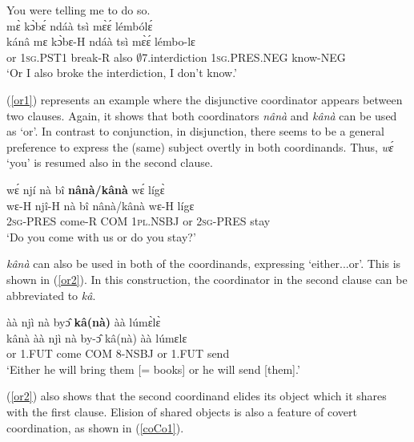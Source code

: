 \begin{exe} 
\ex\label{or} You were telling me to do so.\\
   mɛ̀ kɔ̀bɛ́ ndáà tsì mɛ̀ɛ́ lémbólɛ́\\
        kánâ mɛ kɔ̀bɛ-H ndáà tsì mɛ̀ɛ́ lémbo-lɛ\\
        or 1\textsc{sg}.PST1 break-R also $\emptyset$7.interdiction 1\textsc{sg}.PRES.NEG know-NEG \\
    \trans `Or I also broke the interdiction, I don't know.'
\end{exe}

(\ref{or1}) represents an example where the disjunctive coordinator appears between two clauses. Again, it shows that both coordinators {\itshape nânà} and {\itshape kânà} can be used as `or'. In contrast to conjunction, in disjunction, there seems to be a general preference to express the (same) subject overtly in both coordinands. Thus, {\itshape wɛ́} `you' is resumed also in the second clause.

\begin{exe}
\ex \label{or1}
  \glll     wɛ́ njí nà bî {\bfseries nânà/kânà} wɛ́ lígɛ̀ \\
             wɛ-H njî-H nà bî nânà/kânà  wɛ-H lígɛ \\
               2\textsc{sg}-PRES come-R COM 1\textsc{pl}.NSBJ or 2\textsc{sg}-PRES stay \\
    \trans `Do you come with us or do you stay?'
\end{exe}

{\itshape kânà} can also be used in both of the coordinands, expressing `either...or'. This is shown in (\ref{or2}). In this construction, the coordinator in the second clause can be abbreviated to {\itshape kâ}.

\begin{exe}
\ex \label{or2}
   àà njì nà byɔ̂ {\bfseries kâ(nà)} àà lúmɛ̀lɛ̀ \\
             kânà àà njì nà by-ɔ̂ kâ(nà) àà lúmɛlɛ \\
               or 1.FUT come COM 8-NSBJ or 1.FUT send\\
    \trans `Either he will bring them [= books] or he will send [them].'
\end {exe}

\noindent (\ref{or2}) also shows that the second coordinand elides its object which it shares with the first clause. Elision of shared objects is also a feature of covert coordination, as shown in (\ref{coCo1}).

